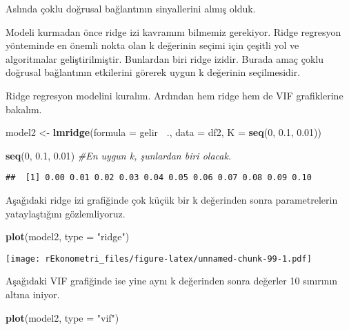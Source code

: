 \documentclass[
]{book}
\newenvironment{Shaded}{\begin{snugshade}}{\end{snugshade}}
\newcommand{\CommentTok}[1]{\textcolor[rgb]{0.56,0.35,0.01}{\textit{#1}}}
\newcommand{\DataTypeTok}[1]{\textcolor[rgb]{0.13,0.29,0.53}{#1}}
\newcommand{\DecValTok}[1]{\textcolor[rgb]{0.00,0.00,0.81}{#1}}
\newcommand{\FloatTok}[1]{\textcolor[rgb]{0.00,0.00,0.81}{#1}}
\newcommand{\KeywordTok}[1]{\textcolor[rgb]{0.13,0.29,0.53}{\textbf{#1}}}
\newcommand{\NormalTok}[1]{#1}
\newcommand{\OperatorTok}[1]{\textcolor[rgb]{0.81,0.36,0.00}{\textbf{#1}}}
\newcommand{\StringTok}[1]{\textcolor[rgb]{0.31,0.60,0.02}{#1}}
\begin{document}
Aslında çoklu doğrusal bağlantının sinyallerini almış olduk.

Modeli kurmadan önce ridge izi kavramını bilmemiz gerekiyor. Ridge regresyon yönteminde en önemli nokta olan k değerinin seçimi için çeşitli yol ve algoritmalar geliştirilmiştir. Bunlardan biri ridge izidir. Burada amaç çoklu doğrusal bağlantının etkilerini görerek uygun k değerinin seçilmesidir.

Ridge regresyon modelini kuralım. Ardından hem ridge hem de VIF grafiklerine bakalım.

\begin{Shaded}
\begin{Highlighting}[]
\NormalTok{model2 <-}\StringTok{ }\KeywordTok{lmridge}\NormalTok{(}\DataTypeTok{formula =}\NormalTok{ gelir }\OperatorTok{~}\NormalTok{., }\DataTypeTok{data =}\NormalTok{ df2, }\DataTypeTok{K =} \KeywordTok{seq}\NormalTok{(}\DecValTok{0}\NormalTok{, }\FloatTok{0.1}\NormalTok{, }\FloatTok{0.01}\NormalTok{))}

\KeywordTok{seq}\NormalTok{(}\DecValTok{0}\NormalTok{, }\FloatTok{0.1}\NormalTok{, }\FloatTok{0.01}\NormalTok{) }\CommentTok{#En uygun k, şunlardan biri olacak.}
\end{Highlighting}
\end{Shaded}

\begin{verbatim}
##  [1] 0.00 0.01 0.02 0.03 0.04 0.05 0.06 0.07 0.08 0.09 0.10
\end{verbatim}

Aşağıdaki ridge izi grafiğinde çok küçük bir k değerinden sonra parametrelerin yataylaştığını gözlemliyoruz.

\begin{Shaded}
\begin{Highlighting}[]
\KeywordTok{plot}\NormalTok{(model2, }\DataTypeTok{type =} \StringTok{"ridge"}\NormalTok{)}
\end{Highlighting}
\end{Shaded}

\texttt{[image: rEkonometri\_files/figure-latex/unnamed-chunk-99-1.pdf]}

Aşağıdaki VIF grafiğinde ise yine aynı k değerinden sonra değerler 10 sınırının altına iniyor.

\begin{Shaded}
\begin{Highlighting}[]
\KeywordTok{plot}\NormalTok{(model2, }\DataTypeTok{type =} \StringTok{"vif"}\NormalTok{)}
\end{Highlighting}
\end{Shaded}
\end{document}
